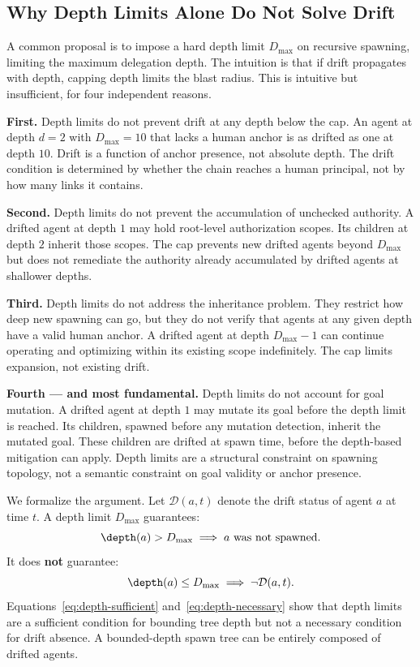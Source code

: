 \subsection{Why Depth Limits Alone Do Not Solve Drift}

A common proposal is to impose a hard depth limit $D_{\max}$ on recursive spawning, limiting the maximum delegation depth. The intuition is that if drift propagates with depth, capping depth limits the blast radius. This is intuitive but insufficient, for four independent reasons.

\textbf{First.} Depth limits do not prevent drift at any depth below the cap. An agent at depth $d = 2$ with $D_{\max} = 10$ that lacks a human anchor is as drifted as one at depth $10$. Drift is a function of anchor presence, not absolute depth. The drift condition is determined by whether the chain reaches a human principal, not by how many links it contains.

\textbf{Second.} Depth limits do not prevent the accumulation of unchecked authority. A drifted agent at depth $1$ may hold root-level authorization scopes. Its children at depth $2$ inherit those scopes. The cap prevents new drifted agents beyond $D_{\max}$ but does not remediate the authority already accumulated by drifted agents at shallower depths.

\textbf{Third.} Depth limits do not address the inheritance problem. They restrict how deep new spawning can go, but they do not verify that agents at any given depth have a valid human anchor. A drifted agent at depth $D_{\max} - 1$ can continue operating and optimizing within its existing scope indefinitely. The cap limits expansion, not existing drift.

\textbf{Fourth — and most fundamental.} Depth limits do not account for goal mutation. A drifted agent at depth $1$ may mutate its goal before the depth limit is reached. Its children, spawned before any mutation detection, inherit the mutated goal. These children are drifted at spawn time, before the depth-based mitigation can apply. Depth limits are a structural constraint on spawning topology, not a semantic constraint on goal validity or anchor presence.

We formalize the argument. Let $\mathcal{D}(a, t)$ denote the drift status of agent $a$ at time $t$. A depth limit $D_{\max}$ guarantees:
\begin{equation}
\depth(a) > D_{\max} \implies a \text{ was not spawned.}
\label{eq:depth-sufficient}
\end{equation}
It does \textbf{not} guarantee:
\begin{equation}
\depth(a) \leq D_{\max} \implies \neg \mathcal{D}(a, t).
\label{eq:depth-necessary}
\end{equation}
Equations~\eqref{eq:depth-sufficient} and~\eqref{eq:depth-necessary} show that depth limits are a sufficient condition for bounding tree depth but not a necessary condition for drift absence. A bounded-depth spawn tree can be entirely composed of drifted agents.

